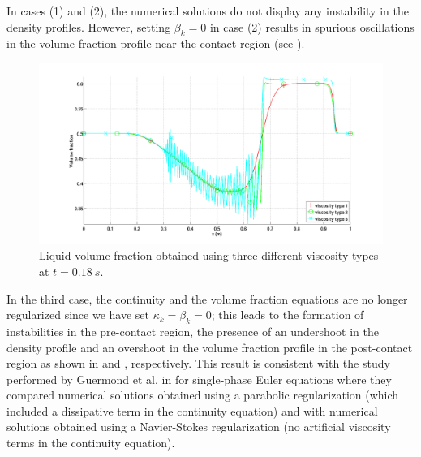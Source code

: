\documentclass[preprint,10pt]{elsarticle}
\begin{document}
%
In cases (1) and (2), the numerical solutions do not display any instability in the density profiles. However, setting $\beta_k=0$ in case (2) results 
in spurious oscillations in the volume fraction profile near the contact region (see ). 
%
\begin{figure}[H]
        \centering
        \includegraphics[width=\textwidth]{../figures/paper/relaxation_liquid_vf_multiple_visc.png}
        \caption{Liquid volume fraction obtained using three different viscosity types at $t=0.18 \ s$.}
        \label{fig:liq-vf}
\end{figure}
%
In the third case, the continuity and the volume fraction equations are no longer regularized since we have set $\kappa_k=\beta_k=0$; this leads to 
the formation of instabilities in the pre-contact region, the presence of an undershoot in the density profile and an overshoot in the volume 
fraction profile in the post-contact region as shown in  and , respectively. This result is consistent with 
the study performed by Guermond et al. in \cite{jlg} for single-phase Euler equations where they compared numerical solutions obtained using 
a parabolic regularization (which included a dissipative term in the continuity equation) and with numerical solutions obtained using a 
Navier-Stokes regularization (no artificial viscosity terms in the continuity equation).
%
\end{document}
